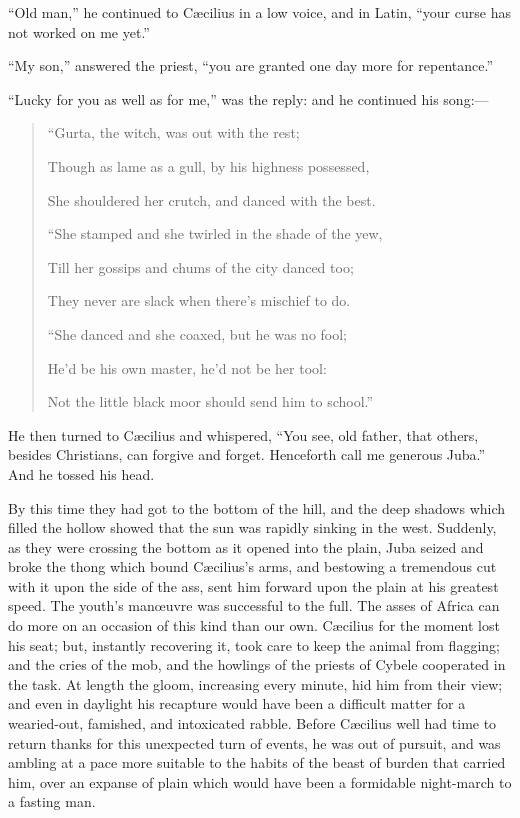 ``Old man,'' he continued to Cæcilius in a low voice, and
in Latin, ``your curse has not worked on me yet.''

``My son,'' answered the priest, ``you are granted one
day more for repentance.''

``Lucky for you as well as for me,'' was the reply: and he
continued his song:—

\begin{quote}

``Gurta, the witch, was out with the rest;

Though as lame as a gull, by his highness possessed,

She shouldered her crutch, and danced with the best.

``She stamped and she twirled in the shade of the yew,

Till her gossips and chums of the city danced too;

They never are slack when there's mischief to do.

``She danced and she coaxed, but he was no fool;

He'd be his own master, he'd not be her tool:

Not the little black moor should send him to school.''

\end{quote}

He then turned to Cæcilius and whispered, ``You see, old
father, that others, besides Christians, can forgive and forget.
Henceforth call me generous Juba.'' And he tossed his head.

By this time they had got to the bottom of the hill, and the deep
shadows which filled the hollow showed that the sun was rapidly
sinking in the west. Suddenly, as they were crossing the bottom as it
opened into the plain, Juba seized and broke the thong which bound
Cæcilius's arms, and bestowing a tremendous cut with it upon the side
of the ass, sent him forward upon the plain at his greatest speed. The
youth's manœuvre was successful to the full. The asses of Africa can
do more on an occasion of this kind than our own. Cæcilius for the
moment lost his seat; but, instantly recovering it, took care to keep
the animal from flagging; and the cries of the mob, and the howlings
of the priests of Cybele cooperated in the task. At length the gloom,
increasing every minute, hid him from their view; and even in daylight
his recapture would have been a difficult matter for a wearied-out,
famished, and intoxicated rabble. Before Cæcilius well had time to
return thanks for this unexpected turn of events, he was out of
pursuit, and was ambling at a pace more suitable to the habits of the
beast of burden that carried him, over an expanse of plain which
would have been a formidable night-march to a fasting man.

